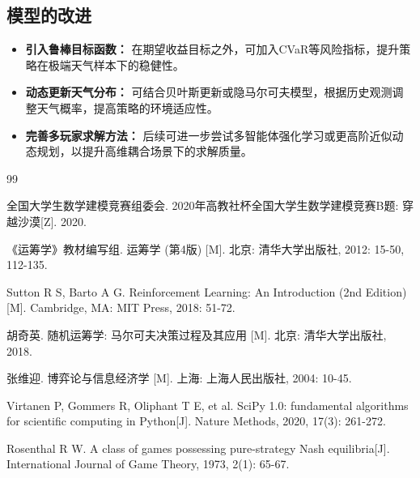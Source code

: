 \documentclass[UTF8,a4paper,12pt]{ctexart}
\begin{document}
\subsection{模型的改进}

\begin{itemize}
    \item \textbf{引入鲁棒目标函数：} 在期望收益目标之外，可加入CVaR等风险指标，提升策略在极端天气样本下的稳健性。
    \item \textbf{动态更新天气分布：} 可结合贝叶斯更新或隐马尔可夫模型，根据历史观测调整天气概率，提高策略的环境适应性。
    \item \textbf{完善多玩家求解方法：} 后续可进一步尝试多智能体强化学习或更高阶近似动态规划，以提升高维耦合场景下的求解质量。
\end{itemize}
\renewcommand{\refname}{参考文献}
\begin{thebibliography}{99}

 全国大学生数学建模竞赛组委会. 2020年高教社杯全国大学生数学建模竞赛B题: 穿越沙漠[Z]. 2020.

 《运筹学》教材编写组. 运筹学 (第4版) [M]. 北京: 清华大学出版社, 2012: 15-50, 112-135.

 Sutton R S, Barto A G. Reinforcement Learning: An Introduction (2nd Edition) [M]. Cambridge, MA: MIT Press, 2018: 51-72.

 胡奇英. 随机运筹学: 马尔可夫决策过程及其应用 [M]. 北京: 清华大学出版社, 2018.

 张维迎. 博弈论与信息经济学 [M]. 上海: 上海人民出版社, 2004: 10-45.

 Virtanen P, Gommers R, Oliphant T E, et al. SciPy 1.0: fundamental algorithms for scientific computing in Python[J]. Nature Methods, 2020, 17(3): 261-272.

 Rosenthal R W. A class of games possessing pure-strategy Nash equilibria[J]. International Journal of Game Theory, 1973, 2(1): 65-67.

\end{thebibliography}
\end{document}
